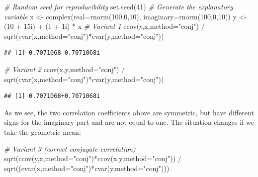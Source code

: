 \documentclass[
]{book}
\newenvironment{Shaded}{\begin{snugshade}}{\end{snugshade}}
\newcommand{\AttributeTok}[1]{\textcolor[rgb]{0.77,0.63,0.00}{#1}}
\newcommand{\CommentTok}[1]{\textcolor[rgb]{0.56,0.35,0.01}{\textit{#1}}}
\newcommand{\DecValTok}[1]{\textcolor[rgb]{0.00,0.00,0.81}{#1}}
\newcommand{\FunctionTok}[1]{\textcolor[rgb]{0.00,0.00,0.00}{#1}}
\newcommand{\NormalTok}[1]{#1}
\newcommand{\OtherTok}[1]{\textcolor[rgb]{0.56,0.35,0.01}{#1}}
\newcommand{\SpecialCharTok}[1]{\textcolor[rgb]{0.00,0.00,0.00}{#1}}
\newcommand{\StringTok}[1]{\textcolor[rgb]{0.31,0.60,0.02}{#1}}
\begin{document}
\begin{Shaded}
\begin{Highlighting}[]
\CommentTok{\# Random seed for reproducibility}
\FunctionTok{set.seed}\NormalTok{(}\DecValTok{41}\NormalTok{)}
\CommentTok{\# Generate the explanatory variable}
\NormalTok{x }\OtherTok{\textless{}{-}} \FunctionTok{complex}\NormalTok{(}\AttributeTok{real=}\FunctionTok{rnorm}\NormalTok{(}\DecValTok{100}\NormalTok{,}\DecValTok{0}\NormalTok{,}\DecValTok{10}\NormalTok{), }\AttributeTok{imaginary=}\FunctionTok{rnorm}\NormalTok{(}\DecValTok{100}\NormalTok{,}\DecValTok{0}\NormalTok{,}\DecValTok{10}\NormalTok{))}
\NormalTok{y }\OtherTok{\textless{}{-}}\NormalTok{ (}\DecValTok{10} \SpecialCharTok{+}\NormalTok{ 15i) }\SpecialCharTok{+}\NormalTok{ (}\DecValTok{1} \SpecialCharTok{+}\NormalTok{ 1i) }\SpecialCharTok{*}\NormalTok{ x}
\CommentTok{\# Variant 1}
\FunctionTok{ccov}\NormalTok{(y,x,}\AttributeTok{method=}\StringTok{"conj"}\NormalTok{) }\SpecialCharTok{/}
    \FunctionTok{sqrt}\NormalTok{(}\FunctionTok{cvar}\NormalTok{(x,}\AttributeTok{method=}\StringTok{"conj"}\NormalTok{)}\SpecialCharTok{*}\FunctionTok{cvar}\NormalTok{(y,}\AttributeTok{method=}\StringTok{"conj"}\NormalTok{))}
\end{Highlighting}
\end{Shaded}

\begin{verbatim}
## [1] 0.7071068-0.7071068i
\end{verbatim}

\begin{Shaded}
\begin{Highlighting}[]
\CommentTok{\# Variant 2}
\FunctionTok{ccov}\NormalTok{(x,y,}\AttributeTok{method=}\StringTok{"conj"}\NormalTok{) }\SpecialCharTok{/}
    \FunctionTok{sqrt}\NormalTok{(}\FunctionTok{cvar}\NormalTok{(x,}\AttributeTok{method=}\StringTok{"conj"}\NormalTok{)}\SpecialCharTok{*}\FunctionTok{cvar}\NormalTok{(y,}\AttributeTok{method=}\StringTok{"conj"}\NormalTok{))}
\end{Highlighting}
\end{Shaded}

\begin{verbatim}
## [1] 0.7071068+0.7071068i
\end{verbatim}

As we see, the two correlation coefficients above are symmetric, but have different signs for the imaginary part and are not equal to one. The situation changes if we take the geometric mean:

\begin{Shaded}
\begin{Highlighting}[]
\CommentTok{\# Variant 3 (correct conjugate correlation)}
\FunctionTok{sqrt}\NormalTok{(}\FunctionTok{ccov}\NormalTok{(y,x,}\AttributeTok{method=}\StringTok{"conj"}\NormalTok{)}\SpecialCharTok{*}\FunctionTok{ccov}\NormalTok{(x,y,}\AttributeTok{method=}\StringTok{"conj"}\NormalTok{)) }\SpecialCharTok{/}
    \FunctionTok{sqrt}\NormalTok{((}\FunctionTok{cvar}\NormalTok{(x,}\AttributeTok{method=}\StringTok{"conj"}\NormalTok{)}\SpecialCharTok{*}\FunctionTok{cvar}\NormalTok{(y,}\AttributeTok{method=}\StringTok{"conj"}\NormalTok{)))}
\end{Highlighting}
\end{Shaded}
\end{document}
